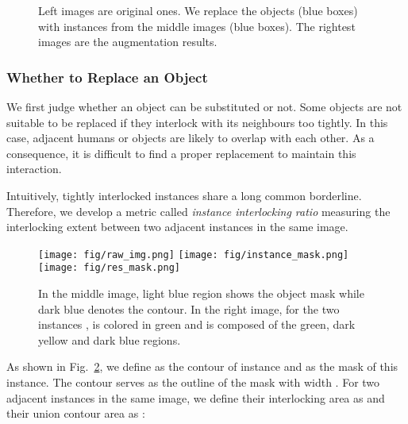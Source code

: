 \documentclass[10pt,twocolumn,letterpaper]{article}
\begin{document}
\begin{figure}[tb!]
\centering
{}
\caption{Left images are original ones. We replace the objects (blue boxes) with instances from the middle images (blue boxes). The rightest images are the augmentation results.}
\label{fig:object exchange}
\end{figure}

\subsubsection{Whether to Replace an Object}
We first judge whether an object can be substituted or not. Some objects are not suitable to be replaced if they interlock with its neighbours too tightly. In this case, adjacent humans or objects are likely to overlap with each other. As a consequence, it is difficult to find a proper replacement to maintain this interaction.

Intuitively, tightly interlocked instances share a long common borderline. Therefore, we develop a metric called \textit{instance interlocking ratio} measuring the interlocking extent between two adjacent instances in the same image.

\begin{figure}[tb!]
\centering
\texttt{[image: fig/raw\_img.png]}
\texttt{[image: fig/instance\_mask.png]}
\texttt{[image: fig/res\_mask.png]}
\caption{In the middle image, light blue region shows the object mask while dark blue denotes the contour. In the right image, for the two instances ,  is colored in green and  is composed of the green, dark yellow and dark blue regions.}
\label{fig:contour_mask}
\end{figure}

As shown in Fig.~\ref{fig:contour_mask}, we define  as the contour of instance  and  as the mask of this instance. The contour  serves as the outline of the mask with width . For two adjacent instances  in the same image, we define their interlocking area as  and their union contour area as :
\end{document}
